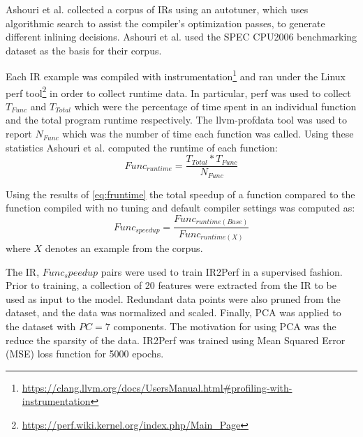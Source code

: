 \documentclass[nohyperref]{article}
\theoremstyle{plain}
\theoremstyle{definition}
\theoremstyle{remark}
\begin{document}
Ashouri et al. collected a corpus of IRs using an autotuner, which uses algorithmic search to assist the compiler's optimization passes, to generate different inlining decisions. Ashouri et al. used the SPEC CPU2006 benchmarking dataset \cite{spec2006} as the basis for their corpus.

Each IR example was compiled with instrumentation\footnote{\href{https://clang.llvm.org/docs/UsersManual.html\#profiling-with-instrumentation}{https://clang.llvm.org/docs/UsersManual.html\#profiling-with-instrumentation}} and ran under the Linux perf tool\footnote{\href{https://perf.wiki.kernel.org/index.php/Main\_Page}{https://perf.wiki.kernel.org/index.php/Main\_Page}} in order to collect runtime data. In particular, perf was used to collect $T_{Func}$ and $T_{Total}$ which were the percentage of time spent in an individual function and the total program runtime respectively. The llvm-profdata tool was used to report $N_{Func}$ which was the number of time each function was called. Using these statistics Ashouri et al. computed the runtime of each function:
\begin{equation} \label{eq:fruntime}
    Func_{runtime} = \frac{T_{Total} * T_{Func}}{N_{Func}}
\end{equation}

Using the results of \ref{eq:fruntime} the total speedup of a function compared to the function compiled with no tuning and default compiler settings was computed as:
\begin{equation}
    Func_{speedup} = \frac{Func_{runtime(Base)}}{Func_{runtime(X)}}
\end{equation}
where $X$ denotes an example from the corpus.

The IR, $Func_speedup$ pairs were used to train IR2Perf in a supervised fashion. Prior to training, a collection of 20 features were extracted from the IR to be used as input to the model. Redundant data points were also pruned from the dataset, and the data was normalized and scaled. Finally, PCA was applied to the dataset with $PC=7$ components. The motivation for using PCA was the reduce the sparsity of the data. IR2Perf was trained using Mean Squared Error (MSE) loss function for 5000 epochs.

\end{document}
